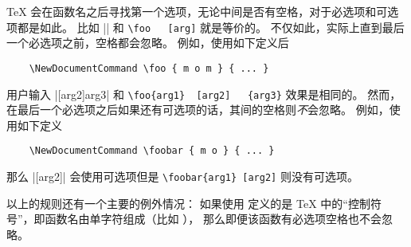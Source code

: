 \documentclass{l3doc}
\begin{document}
%
\TeX{} 会在函数名之后寻找第一个选项，无论中间是否有空格，对于必选项和可选项都是如此。
比如 |\foo[arg]| 和 \verb*|\foo   [arg]| 就是等价的。
不仅如此，实际上直到最后一个必选项之前，空格都会忽略。
例如，使用如下定义后
\begin{verbatim}
    \NewDocumentCommand \foo { m o m } { ... }
\end{verbatim}
用户输入 |[arg2]{arg3}| 和 \verb*|\foo{arg1}  [arg2]   {arg3}| 效果是相同的。
然而，在最后一个必选项之后如果还有可选项的话，其间的空格则\emph{不}会忽略。
例如，使用如下定义
\begin{verbatim}
    \NewDocumentCommand \foobar { m o } { ... }
\end{verbatim}
那么 |[arg2]| 会使用可选项但是 \verb*|\foobar{arg1} [arg2]| 则没有可选项。

%
以上的规则还有一个主要的例外情况：
如果使用  定义的是 \TeX{} 中的“控制符号”，即函数名由单字符组成（比如 \cmd{\\}），
那么即便该函数有必选项空格也不会忽略。

%
\end{document}
